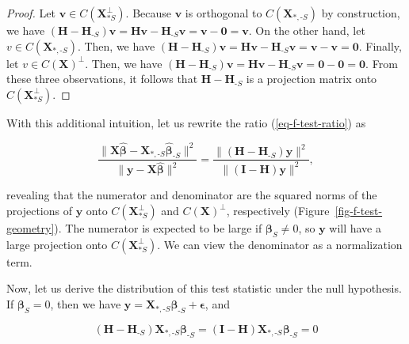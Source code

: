 \documentclass[
  11pt,
  letterpaper,
  oneside]{book}
\theoremstyle{plain}
\theoremstyle{plain}
\theoremstyle{definition}
\theoremstyle{definition}
\theoremstyle{plain}
\theoremstyle{remark}
\begin{document}
\begin{proof}

Let \(\boldsymbol v \in C(\boldsymbol{X}_{*S}^\perp)\). Because
\(\boldsymbol v\) is orthogonal to \(C(\boldsymbol X_{*,\text{-}S})\) by
construction, we have
\((\boldsymbol{H} - \boldsymbol{H}_{\text{-}S})\boldsymbol v = \boldsymbol{H}\boldsymbol v - \boldsymbol{H}_{\text{-}S}\boldsymbol v = \boldsymbol v - \boldsymbol 0 = \boldsymbol v\).
On the other hand, let \(v \in C(\boldsymbol X_{*, \text{-}S})\). Then,
we have
\((\boldsymbol{H} - \boldsymbol{H}_{\text{-}S})\boldsymbol v = \boldsymbol{H}\boldsymbol v - \boldsymbol{H}_{\text{-}S}\boldsymbol v = \boldsymbol v - \boldsymbol v = \boldsymbol 0\).
Finally, let \(v \in C(\boldsymbol X)^\perp\). Then, we have
\((\boldsymbol{H} - \boldsymbol{H}_{\text{-}S})\boldsymbol v = \boldsymbol{H}\boldsymbol v - \boldsymbol{H}_{\text{-}S}\boldsymbol v = \boldsymbol 0 - \boldsymbol 0 = \boldsymbol 0\).
From these three observations, it follows that
\(\boldsymbol{H} - \boldsymbol{H}_{\text{-}S}\) is a projection matrix
onto \(C(\boldsymbol{X}_{*S}^\perp)\).

\end{proof}

With this additional intuition, let us rewrite the ratio
(\ref{eq-f-test-ratio}) as

\[
\frac{\|\boldsymbol{X} \boldsymbol{\widehat{\beta}} - \boldsymbol{X}_{*, \text{-}S} \boldsymbol{\widehat{\beta}}_{\text{-}S}\|^2}{\|\boldsymbol{y} - \boldsymbol{X} \boldsymbol{\widehat{\beta}}\|^2} = \frac{\|(\boldsymbol{H} - \boldsymbol{H}_{\text{-}S}) \boldsymbol{y}\|^2}{\|(\boldsymbol{I} - \boldsymbol{H}) \boldsymbol{y}\|^2},
\]

revealing that the numerator and denominator are the squared norms of
the projections of \(\boldsymbol{y}\) onto
\(C(\boldsymbol{X}_{*S}^\perp)\) and \(C(\boldsymbol{X})^\perp\),
respectively (Figure~\ref{fig-f-test-geometry}). The numerator is
expected to be large if \(\boldsymbol \beta_{S} \neq 0\), so
\(\boldsymbol y\) will have a large projection onto
\(C(\boldsymbol{X}_{*S}^\perp)\). We can view the denominator as a
normalization term.

Now, let us derive the distribution of this test statistic under the
null hypothesis. If \(\boldsymbol \beta_{S} = 0\), then we have
\(\boldsymbol{y} = \boldsymbol{X}_{*, \text{-}S} \boldsymbol{\beta}_{\text{-}S} + \boldsymbol{\epsilon}\),
and

\[
(\boldsymbol{H} - \boldsymbol{H}_{\text{-}S}) \boldsymbol{X}_{*,\text{-}S} \boldsymbol{\beta}_{\text{-}S} = (\boldsymbol{I} - \boldsymbol{H}) \boldsymbol{X}_{*,\text{-}S} \boldsymbol{\beta}_{\text{-}S} = 0
\]
\end{document}

